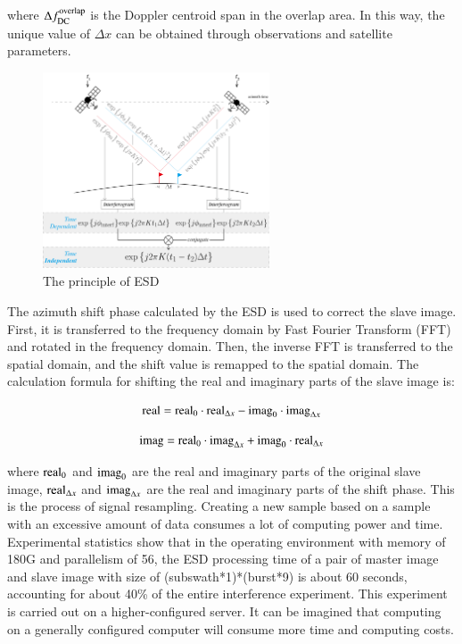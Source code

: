 \documentclass[preprint, authoryear]{elsarticle}
\begin{document}
\noindent where $\Delta f_{\rm DC}^{\rm overlap}$ is the Doppler centroid span in the overlap area. In this way, the unique value of $\Delta x$ can be obtained through observations and satellite parameters. \par

\begin{figure}
	\centering
	\includegraphics[width=0.6\textwidth]{figure/The principle of ESD.png}
	\caption{The principle of ESD}
	\label{fig_2}%
\end{figure}

The azimuth shift phase calculated by the ESD is used to correct the slave image. First, it is transferred to the frequency domain by Fast Fourier Transform (FFT) and rotated in the frequency domain. Then, the inverse FFT is transferred to the spatial domain, and the shift value is remapped to the spatial domain. The calculation formula for shifting the real and imaginary parts of the slave image is: \par

\begin{equation}
    {\rm real} = {\rm real}_0 \cdot {\rm real}_{\Delta x} - {\rm imag}_0 \cdot {\rm imag}_{\Delta x}
    \label{eq_4}
\end{equation}

\begin{equation}
    {\rm imag} = {\rm real}_0 \cdot {\rm imag}_{\Delta x} + {\rm imag}_0 \cdot {\rm real}_{\Delta x}
    \label{eq_5}
\end{equation}

\noindent where ${\rm real}_0$ and ${\rm imag}_0$ are the real and imaginary parts of the original slave image, ${\rm real}_{\Delta x}$ and ${\rm imag}_{\Delta x}$ are the real and imaginary parts of the shift phase. This is the process of signal resampling. Creating a new sample based on a sample with an excessive amount of data consumes a lot of computing power and time. Experimental statistics show that in the operating environment with memory of 180G and parallelism of 56, the ESD processing time of a pair of master image and slave image with size of (subswath*1)*(burst*9) is about 60 seconds, accounting for about 40\% of the entire interference experiment. This experiment is carried out on a higher-configured server. It can be imagined that computing on a generally configured computer will consume more time and computing costs. \par
\end{document}
